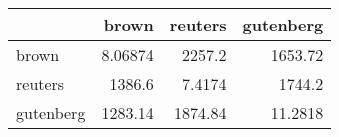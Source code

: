 \begin{tabular}{lrrr}
\hline
           &      brown &   reuters &   gutenberg \\
\hline
 brown     &    8.06874 & 2257.2    &   1653.72   \\
 reuters   & 1386.6     &    7.4174 &   1744.2    \\
 gutenberg & 1283.14    & 1874.84   &     11.2818 \\
\hline
\end{tabular}